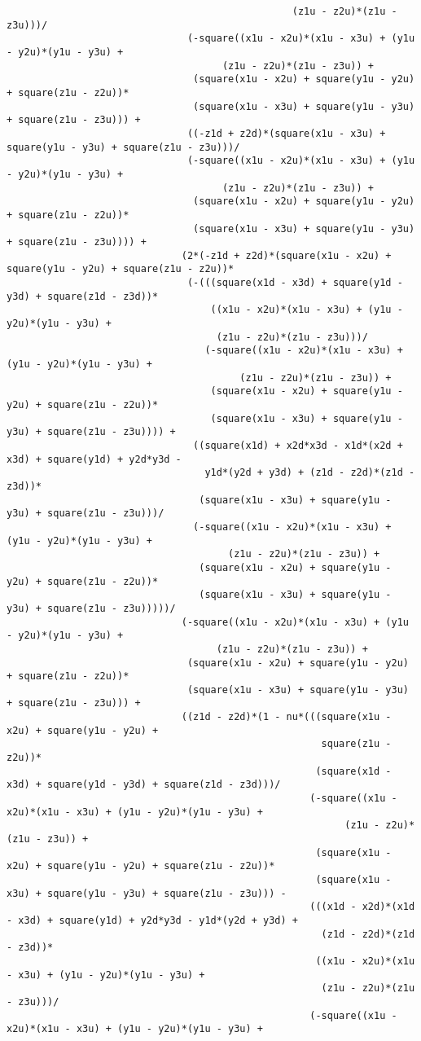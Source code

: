 \begin{lstlisting}
												 (z1u - z2u)*(z1u - z3u)))/
							   (-square((x1u - x2u)*(x1u - x3u) + (y1u - y2u)*(y1u - y3u) + 
									 (z1u - z2u)*(z1u - z3u)) + 
								(square(x1u - x2u) + square(y1u - y2u) + square(z1u - z2u))*
								(square(x1u - x3u) + square(y1u - y3u) + square(z1u - z3u))) + 
							   ((-z1d + z2d)*(square(x1u - x3u) + square(y1u - y3u) + square(z1u - z3u)))/
							   (-square((x1u - x2u)*(x1u - x3u) + (y1u - y2u)*(y1u - y3u) + 
									 (z1u - z2u)*(z1u - z3u)) + 
								(square(x1u - x2u) + square(y1u - y2u) + square(z1u - z2u))*
								(square(x1u - x3u) + square(y1u - y3u) + square(z1u - z3u)))) + 
							  (2*(-z1d + z2d)*(square(x1u - x2u) + square(y1u - y2u) + square(z1u - z2u))*
							   (-(((square(x1d - x3d) + square(y1d - y3d) + square(z1d - z3d))*
								   ((x1u - x2u)*(x1u - x3u) + (y1u - y2u)*(y1u - y3u) + 
									(z1u - z2u)*(z1u - z3u)))/
								  (-square((x1u - x2u)*(x1u - x3u) + (y1u - y2u)*(y1u - y3u) + 
										(z1u - z2u)*(z1u - z3u)) + 
								   (square(x1u - x2u) + square(y1u - y2u) + square(z1u - z2u))*
								   (square(x1u - x3u) + square(y1u - y3u) + square(z1u - z3u)))) + 
								((square(x1d) + x2d*x3d - x1d*(x2d + x3d) + square(y1d) + y2d*y3d - 
								  y1d*(y2d + y3d) + (z1d - z2d)*(z1d - z3d))*
								 (square(x1u - x3u) + square(y1u - y3u) + square(z1u - z3u)))/
								(-square((x1u - x2u)*(x1u - x3u) + (y1u - y2u)*(y1u - y3u) + 
									  (z1u - z2u)*(z1u - z3u)) + 
								 (square(x1u - x2u) + square(y1u - y2u) + square(z1u - z2u))*
								 (square(x1u - x3u) + square(y1u - y3u) + square(z1u - z3u)))))/
							  (-square((x1u - x2u)*(x1u - x3u) + (y1u - y2u)*(y1u - y3u) + 
									(z1u - z2u)*(z1u - z3u)) + 
							   (square(x1u - x2u) + square(y1u - y2u) + square(z1u - z2u))*
							   (square(x1u - x3u) + square(y1u - y3u) + square(z1u - z3u))) + 
							  ((z1d - z2d)*(1 - nu*(((square(x1u - x2u) + square(y1u - y2u) + 
													  square(z1u - z2u))*
													 (square(x1d - x3d) + square(y1d - y3d) + square(z1d - z3d)))/
													(-square((x1u - x2u)*(x1u - x3u) + (y1u - y2u)*(y1u - y3u) + 
														  (z1u - z2u)*(z1u - z3u)) + 
													 (square(x1u - x2u) + square(y1u - y2u) + square(z1u - z2u))*
													 (square(x1u - x3u) + square(y1u - y3u) + square(z1u - z3u))) - 
													(((x1d - x2d)*(x1d - x3d) + square(y1d) + y2d*y3d - y1d*(y2d + y3d) + 
													  (z1d - z2d)*(z1d - z3d))*
													 ((x1u - x2u)*(x1u - x3u) + (y1u - y2u)*(y1u - y3u) + 
													  (z1u - z2u)*(z1u - z3u)))/
													(-square((x1u - x2u)*(x1u - x3u) + (y1u - y2u)*(y1u - y3u) + 

\end{lstlisting}
